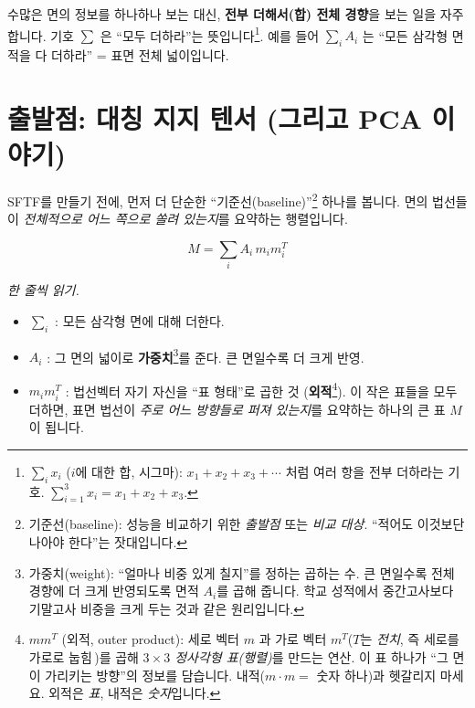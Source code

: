 \documentclass[11pt,a4paper]{article}
\begin{document}
수많은 면의 정보를 하나하나 보는 대신, \textbf{전부 더해서(합) 전체 경향}을 보는
일을 자주 합니다. 기호 $\sum$ 은 ``모두 더하라''는 뜻입니다\footnote{$\sum_i x_i$
($i$에 대한 합, 시그마): $x_1+x_2+x_3+\cdots$ 처럼 여러 항을 전부 더하라는 기호.
$\sum_{i=1}^{3} x_i = x_1+x_2+x_3$.}. 예를 들어 $\sum_i A_i$ 는 ``모든 삼각형 면적을
다 더하라'' = 표면 전체 넓이입니다.

\section{출발점: 대칭 지지 텐서 (그리고 PCA 이야기)}

SFTF를 만들기 전에, 먼저 더 단순한 ``기준선(baseline)''\footnote{기준선(baseline):
성능을 비교하기 위한 \emph{출발점} 또는 \emph{비교 대상}. ``적어도 이것보단 나아야
한다''는 잣대입니다.} 하나를 봅니다. 면의 법선들이 \emph{전체적으로 어느 쪽으로
쏠려 있는지}를 요약하는 행렬입니다.

\begin{equation}
M=\sum_i A_i\, m_i m_i^{T}
\label{eq:M}
\end{equation}

\noindent\textit{한 줄씩 읽기.}
\begin{itemize}[leftmargin=1.6em]
\item $\sum_i$ : 모든 삼각형 면에 대해 더한다.
\item $A_i$ : 그 면의 넓이로 \textbf{가중치}\footnote{가중치(weight): ``얼마나 비중
있게 칠지''를 정하는 곱하는 수. 큰 면일수록 전체 경향에 더 크게 반영되도록 면적 $A_i$를
곱해 줍니다. 학교 성적에서 중간고사보다 기말고사 비중을 크게 두는 것과 같은 원리입니다.}를
준다. 큰 면일수록 더 크게 반영.
\item $m_i m_i^{T}$ : 법선벡터 자기 자신을 ``표 형태''로 곱한 것
(\textbf{외적}\footnote{$m m^{T}$ (외적, outer product): 세로 벡터 $m$ 과 가로 벡터
$m^{T}$($T$는 \emph{전치}, 즉 세로를 가로로 눕힘\,\footnotemark)를 곱해
\emph{$3\times3$ 정사각형 표(행렬)}를 만드는 연산. 이 표 하나가 ``그 면이 가리키는
방향''의 정보를 담습니다. 내적($m\cdot m=$ 숫자 하나)과 헷갈리지 마세요. 외적은
\emph{표}, 내적은 \emph{숫자}입니다.}).
이 작은 표들을 모두 더하면, 표면 법선이 \emph{주로 어느 방향들로 퍼져 있는지}를
요약하는 하나의 큰 표 $M$ 이 됩니다.
\end{itemize}
\end{document}
